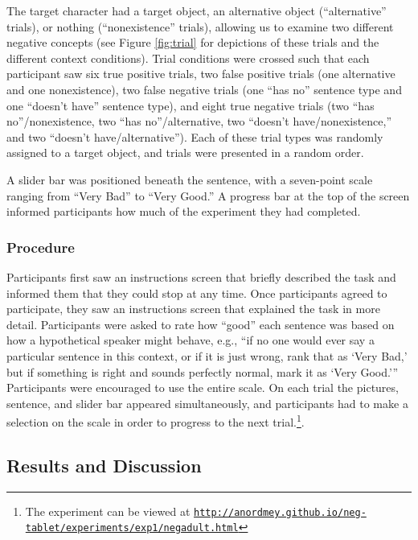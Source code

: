\documentclass[man, noapacite]{apa2}
\begin{document}
The target character had a target object, an alternative object (``alternative'' trials), or nothing (``nonexistence'' trials), allowing us to examine two different negative concepts (see Figure \ref{fig:trial} for depictions of these trials and the different context conditions).  Trial conditions were crossed such that each participant saw six true positive trials, two false positive trials (one alternative and one nonexistence), two false negative trials (one ``has no'' sentence type and one ``doesn't have'' sentence type), and eight true negative trials (two ``has no''/nonexistence, two ``has no''/alternative, two ``doesn't have/nonexistence,'' and two ``doesn't have/alternative''). Each of these trial types was randomly assigned to a target object, and trials were presented in a random order.

A slider bar was positioned beneath the sentence, with a seven-point scale ranging from ``Very Bad'' to ``Very Good.'' A progress bar at the top of the screen informed participants how much of the experiment they had completed.

\subsubsection{Procedure}

Participants first saw an instructions screen that briefly described the task and informed them that they could stop at any time. Once participants agreed to participate, they saw an instructions screen that explained the task in more detail. Participants were asked to rate how ``good'' each sentence was based on how a hypothetical speaker might behave, e.g., ``if no one would ever say a particular sentence in this context, or if it is just wrong, rank that as `Very Bad,' but if something is right and sounds perfectly normal, mark it as `Very Good.''' Participants were encouraged to use the entire scale. On each trial the pictures, sentence, and slider bar appeared simultaneously, and participants had to make a selection on the scale in order to progress to the next trial.\footnote{The experiment can be viewed at \href{http://anordmey.github.io/neg-tablet/experiments/exp1/negadult.html}{\nolinkurl{http://anordmey.github.io/neg-tablet/experiments/exp1/negadult.html}}}.

\subsection{Results and Discussion}
\end{document}
